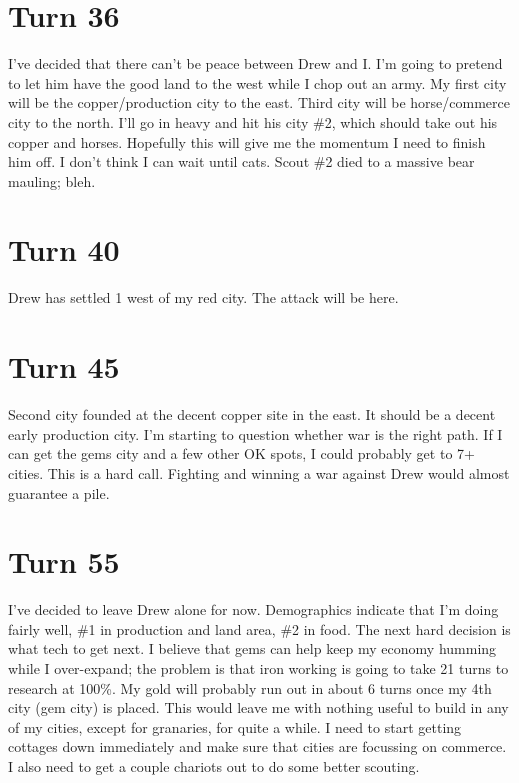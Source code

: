 \documentclass[10pt]{article}
\begin{document}
\section*{Turn 36}

I've decided that there can't be peace between Drew and I. I'm going
to pretend to let him have the good land to the west while I chop out
an army. My first city will be the copper/production city to the
east. Third city will be horse/commerce city to the north. I'll go in
heavy and hit his city \#2, which should take out his copper and
horses. Hopefully this will give me the momentum I need to finish him
off. I don't think I can wait until cats. Scout \#2 died to a massive
bear mauling; bleh.

\section*{Turn 40}

Drew has settled 1 west of my red city. The attack will be here.

\section*{Turn 45}

Second city founded at the decent copper site in the east. It should
be a decent early production city. I'm starting to question whether
war is the right path. If I can get the gems city and a few other OK
spots, I could probably get to 7+ cities. This is a hard
call. Fighting and winning a war against Drew would almost guarantee a
pile.

\section*{Turn 55}

I've decided to leave Drew alone for now. Demographics indicate that
I'm doing fairly well, \#1 in production and land area, \#2 in food. The
next hard decision is what tech to get next. I believe that gems can
help keep my economy humming while I over-expand; the problem is that
iron working is going to take 21 turns to research at 100\%. My gold
will probably run out in about 6 turns once my 4th city (gem city) is
placed. This would leave me with nothing useful to build in any of my
cities, except for granaries, for quite a while. I need to start
getting cottages down immediately and make sure that cities are
focussing on commerce. I also need to get a couple chariots out to do
some better scouting.
\end{document}
